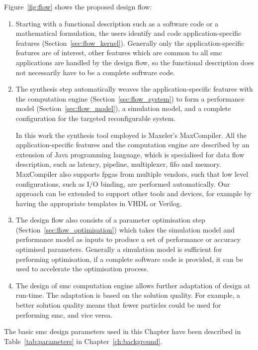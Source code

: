 Figure~\ref{fig:flow} shows the proposed design flow:

\begin{enumerate}
\item Starting with a functional description such as a software code or a mathematical formulation, the users identify and code application-specific features (Section~\ref{sec:flow_kernel}). 
Generally only the application-specific features are of interest, other features which are common to all \gls{smc} applications are handled by the design flow, so the functional description does not necessarily have to be a complete software code.
\item The synthesis step automatically weaves the application-specific features with the computation engine (Section~\ref{sec:flow_system}) to form a performance model (Section~\ref{sec:flow_model}), a simulation model, and a complete configuration for the targeted reconfigurable system.

In this work the synthesis tool employed is Maxeler's MaxCompiler.
All the application-specific features and the computation engine are described by an extension of Java programming language, which is specialised for data flow description, such as latency, pipeline, multiplexer, \gls{fifo} and memory.
MaxCompiler also supports \glspl{fpga} from multiple vendors, such that low level configurations, such as I/O binding, are performed automatically.
Our approach can be extended to support other tools and devices, for example by having the appropriate templates in VHDL or Verilog.
\item The design flow also consists of a parameter optimisation step (Section~\ref{sec:flow_optimisation}) which takes the simulation model and performance model as inputs to produce a set of performance or accuracy optimised parameters.
Generally a simulation model is sufficient for performing optimisation, if a complete software code is provided, it can be used to accelerate the optimisation process.
\item The design of \gls{smc} computation engine allows further adaptation of design at run-time.
The adaptation is based on the solution quality.
For example, a better solution quality means that fewer particles could be used for performing \gls{smc}, and vice versa.
\end{enumerate}

The basic \gls{smc} design parameters used in this Chapter have been described in Table~\ref{tab:parameters} in Chapter~\ref{ch:background}.


